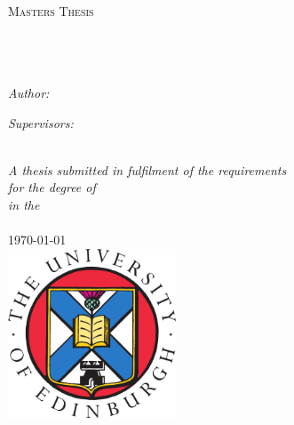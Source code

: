 \documentclass[11pt, oneside]{Thesis} %
\begin{document}
\begin{titlepage}
\begin{center}

\textsc{\LARGE \univname}\\[1.5cm] %
\textsc{\Large Masters Thesis}\\[0.5cm] %

\HRule \\[0.4cm] %
{\huge \bfseries \ttitle}\\[0.4cm] %
\HRule \\[1.5cm] %

\begin{minipage}{0.4\textwidth}
\begin{flushleft} \large
\emph{Author:}\\
\href{}{\authornames} %
\end{flushleft}
\end{minipage}
\begin{minipage}{0.4\textwidth}
\begin{flushright} \large
\emph{Supervisors:} \\
\href{}{\supname} %
\end{flushright}
\end{minipage}\\[3cm]

\large \textit{A thesis submitted in fulfilment of the requirements\\ for the degree of \degreename}\\[0.3cm] %
\textit{in the}\\[0.4cm]

\deptname\\[2cm] %

{\large \today}\\[1cm] %
\includegraphics[width=5cm]{./Figures/UoE_logo.png} %

\vfill
\end{center}

\end{titlepage}
\end{document}
